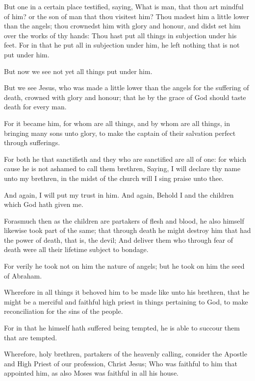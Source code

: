 \Verse But one in a certain place testified, saying, What is man, that thou art mindful of him? or the son of man that thou visitest him?  \Verse Thou madest him a little lower than the angels; thou crownedst him with glory and honour, and didst set him over the works of thy hands: \Verse Thou hast put all things in subjection under his feet. For in that he put all in subjection under him, he left nothing that is not put under him.

But now we see not yet all things put under him.

\Verse But we see Jesus, who was made a little lower than the angels for the suffering of death, crowned with glory and honour; that he by the grace of God should taste death for every man.

\Verse For it became him, for whom are all things, and by whom are all things, in bringing many sons unto glory, to make the captain of their salvation perfect through sufferings.

\Verse For both he that sanctifieth and they who are sanctified are all of one: for which cause he is not ashamed to call them brethren, \Verse Saying, I will declare thy name unto my brethren, in the midst of the church will I sing praise unto thee.

\Verse And again, I will put my trust in him. And again, Behold I and the children which God hath given me.

\Verse Forasmuch then as the children are partakers of flesh and blood, he also himself likewise took part of the same; that through death he might destroy him that had the power of death, that is, the devil; \Verse And deliver them who through fear of death were all their lifetime subject to bondage.

\Verse For verily he took not on him the nature of angels; but he took on him the seed of Abraham.

\Verse Wherefore in all things it behoved him to be made like unto his brethren, that he might be a merciful and faithful high priest in things pertaining to God, to make reconciliation for the sins of the people.

\Verse For in that he himself hath suffered being tempted, he is able to succour them that are tempted.


\Chapter
\Verse Wherefore, holy brethren, partakers of the heavenly calling, consider the Apostle and High Priest of our profession, Christ Jesus; \Verse Who was faithful to him that appointed him, as also Moses was faithful in all his house.

